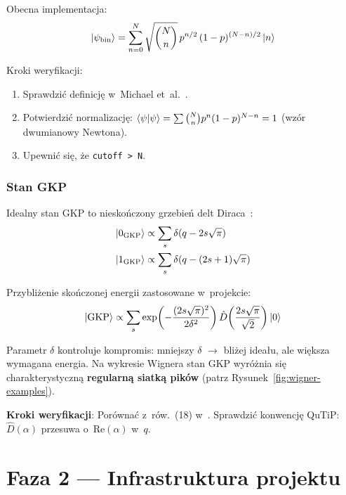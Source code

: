 \documentclass[12pt,a4paper]{article}
\begin{document}
Obecna implementacja:
\begin{equation}
    \ket{\psi_\mathrm{bin}} = \sum_{n=0}^{N} \sqrt{\binom{N}{n}}\, p^{n/2}\, (1-p)^{(N-n)/2} \ket{n}
    \label{eq:binomial}
\end{equation}

Kroki weryfikacji:
\begin{enumerate}
    \item Sprawdzić definicję w~Michael et~al.~\cite{michael2016}.
    \item Potwierdzić normalizację: $\braket{\psi|\psi} = \sum \binom{N}{n} p^n (1-p)^{N-n} = 1$ (wzór dwumianowy Newtona).
    \item Upewnić się, że \texttt{cutoff > N}.
\end{enumerate}

\subsubsection{Stan GKP}

Idealny stan GKP to nieskończony grzebień delt Diraca~\cite{gottesman2001}:
\begin{align}
    \ket{0_\mathrm{GKP}} &\propto \sum_s \delta(q - 2s\sqrt{\pi}) \label{eq:gkp-ideal-0} \\
    \ket{1_\mathrm{GKP}} &\propto \sum_s \delta(q - (2s+1)\sqrt{\pi}) \label{eq:gkp-ideal-1}
\end{align}

Przybliżenie skończonej energii zastosowane w~projekcie:
\begin{equation}
    \ket{\mathrm{GKP}} \propto \sum_s \exp\!\left(-\frac{(2s\sqrt{\pi})^2}{2\delta^2}\right) \hat{D}\!\left(\frac{2s\sqrt{\pi}}{\sqrt{2}}\right) \ket{0}
    \label{eq:gkp-approx}
\end{equation}

Parametr $\delta$ kontroluje kompromis: mniejszy $\delta$ $\to$ bliżej ideału, ale większa wymagana energia. Na wykresie Wignera stan GKP wyróżnia się charakterystyczną \textbf{regularną siatką pików} (patrz Rysunek~\ref{fig:wigner-examples}).

\textbf{Kroki weryfikacji}: Porównać z~rów.~(18) w~\cite{gottesman2001}. Sprawdzić konwencję QuTiP: $\hat{D}(\alpha)$ przesuwa o~$\mathrm{Re}(\alpha)$ w~$q$.

\section{Faza 2 --- Infrastruktura projektu}
\label{sec:faza2}
\end{document}
